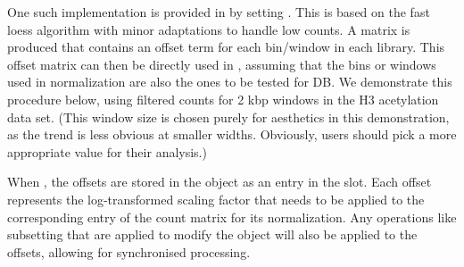 \documentclass{report}\usepackage[]{graphicx}\usepackage[usenames,dvipsnames]{color}
\newcommand{\hlnum}[1]{\textcolor[rgb]{0.816,0.125,0.439}{#1}}%
\newcommand{\hlstr}[1]{\textcolor[rgb]{0.251,0.627,0.251}{#1}}%
\newcommand{\hlopt}[1]{\textcolor[rgb]{0,0,0}{#1}}%
\newcommand{\hlstd}[1]{\textcolor[rgb]{0.251,0.251,0.251}{#1}}%
\newcommand{\hlkwb}[1]{\textcolor[rgb]{0,0,0}{#1}}%
\newcommand{\hlkwc}[1]{\textcolor[rgb]{0.251,0.251,0.251}{#1}}%
\newcommand{\hlkwd}[1]{\textcolor[rgb]{0.878,0.439,0.125}{#1}}%
\newenvironment{knitrout}{}{} %
\begin{document}
One such implementation is provided in  by setting .
This is based on the fast loess algorithm \cite{ballman2004} with minor adaptations to handle low counts. 
A matrix is produced that contains an offset term for each bin/window in each library.
This offset matrix can then be directly used in , assuming that the bins or windows used in normalization are also the ones to be tested for DB.
We demonstrate this procedure below, using filtered counts for 2 kbp windows in the H3 acetylation data set.
(This window size is chosen purely for aesthetics in this demonstration, as the trend is less obvious at smaller widths.
Obviously, users should pick a more appropriate value for their analysis.)

\begin{knitrout}
\color{fgcolor}
\end{knitrout}

When , the offsets are stored in the  object as an  entry in the  slot.
Each offset represents the log-transformed scaling factor that needs to be applied to the corresponding entry of the count matrix for its normalization.
Any operations like subsetting that are applied to modify the object will also be applied to the offsets, allowing for synchronised processing.
\end{document}
